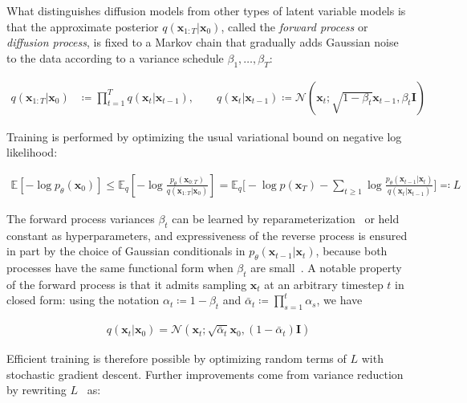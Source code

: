 What distinguishes diffusion models from other types of latent variable models is that the approximate posterior $q(\mathbf{x}_{1:T}|\mathbf{x}_0)$, called the \emph{forward process} or \emph{diffusion process}, is fixed to a Markov chain that gradually adds Gaussian noise to the data according to a variance schedule $\beta_1, \dotsc, \beta_T$:

\begin{align}
q(\mathbf{x}_{1:T} | \mathbf{x}_0) &\coloneqq \prod_{t=1}^T q(\mathbf{x}_t | \mathbf{x}_{t-1} ), \qquad 
q(\mathbf{x}_t|\mathbf{x}_{t-1}) \coloneqq \mathcal{N}(\mathbf{x}_t;\sqrt{1-\beta_t}\mathbf{x}_{t-1},\beta_t \mathbf{I}) \label{eq:forwardprocess}
\end{align}

Training is performed by optimizing the usual variational bound on negative log likelihood:

\begin{align}
\mathbb{E}\left[-\log p_\theta(\mathbf{x}_0)\right] \leq \mathbb{E}_{q}\!\left[ - \log \frac{p_\theta(\mathbf{x}_{0:T})}{q(\mathbf{x}_{1:T} | \mathbf{x}_0)}\right]
  = \mathbb{E}_q\bigg[ -\log p(\mathbf{x}_T) - \sum_{t \geq 1} \log \frac{p_\theta(\mathbf{x}_{t-1} | \mathbf{x}_t)}{q(\mathbf{x}_t|\mathbf{x}_{t-1})} \bigg] \eqqcolon L \label{eq:vb_original}
\end{align}

The forward process variances $\beta_t$ can be learned by reparameterization~\citep{kingma2013auto} or held constant as hyperparameters, and expressiveness of the reverse process is ensured in part by the choice of Gaussian conditionals in $p_\theta(\mathbf{x}_{t-1}|\mathbf{x}_t)$, because both processes have the same functional form when $\beta_t$ are small~\citep{sohl2015deep}. A notable property of the forward process is that it admits sampling  $\mathbf{x}_t$ at an arbitrary timestep $t$ in closed form: using the notation $\alpha_t \coloneqq 1-\beta_t$ and $\bar\alpha_t \coloneqq \prod_{s=1}^t \alpha_s$, we have

\begin{align}
  q(\mathbf{x}_t|\mathbf{x}_0) = \mathcal{N}(\mathbf{x}_t; \sqrt{\bar\alpha_t}\mathbf{x}_0, (1-\bar\alpha_t)\mathbf{I}) \label{eq:q_marginal_arbitrary_t}
\end{align}

Efficient training is therefore possible by optimizing random terms of $L$ with stochastic gradient descent. Further improvements come from variance reduction by rewriting $L$~ as:

